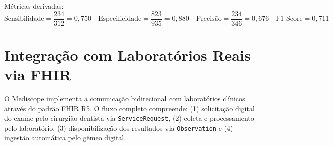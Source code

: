 Métricas derivadas:
\[
\text{Sensibilidade} = \frac{234}{312} = 0,750 \quad
\text{Especificidade} = \frac{823}{935} = 0,880 \quad
\text{Precisão} = \frac{234}{346} = 0,676 \quad
\text{F1-Score} = 0,711
\]

\section{Integração com Laboratórios Reais via FHIR}
\label{sec:integracao-fhir-lab}

O Mediscope implementa a comunicação bidirecional com laboratórios clínicos através do padrão FHIR R5. O fluxo completo compreende: (1) solicitação digital do exame pelo cirurgião-dentista via \texttt{ServiceRequest}, (2) coleta e processamento pelo laboratório, (3) disponibilização dos resultados via \texttt{Observation} e (4) ingestão automática pelo gêmeo digital.

